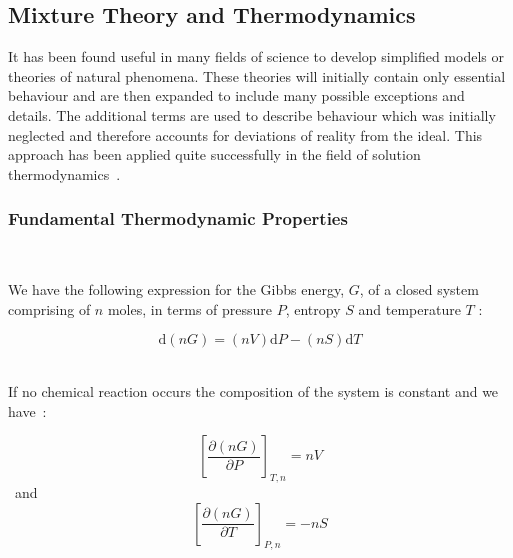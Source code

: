 
\subsection{Mixture Theory and Thermodynamics}

It has been found useful in many fields of science to develop simplified models or theories of natural phenomena. These theories will initially contain only essential behaviour and are then expanded to include many possible exceptions and details. The additional terms are used to describe behaviour which was initially neglected and therefore accounts for deviations of reality from the ideal. This approach has been applied quite successfully in the field of solution thermodynamics~\cite{MolecularThermodynamicsOfFluidPhaseEquilibria}.\\

\subsubsection{Fundamental Thermodynamic Properties}\

We have the following expression for the Gibbs energy, $G$, of a closed system comprising of $n$ moles, in terms of pressure $P$, entropy $S$ and temperature $T$ \cite{SmithNessAbbott}:\

\begin{equation}
\mathrm{d}\left(nG\right) = \left(nV\right) \mathrm{d}P - \left(nS\right) \mathrm{d}T \label{GibbsClosedSystem}
\end{equation}\


If no chemical reaction occurs the composition of the system is constant and we have~\cite{SmithNessAbbott}:\

\begin{equation}
\left[\frac{\partial \left(nG\right)}{\partial P}\right]_{T, n}  = nV \label{nV}
\end{equation}\
and 
\begin{equation}
\left[\frac{\partial \left(nG\right)}{\partial T}\right]_{P, n}  = -nS \label{nS}
\end{equation}\

